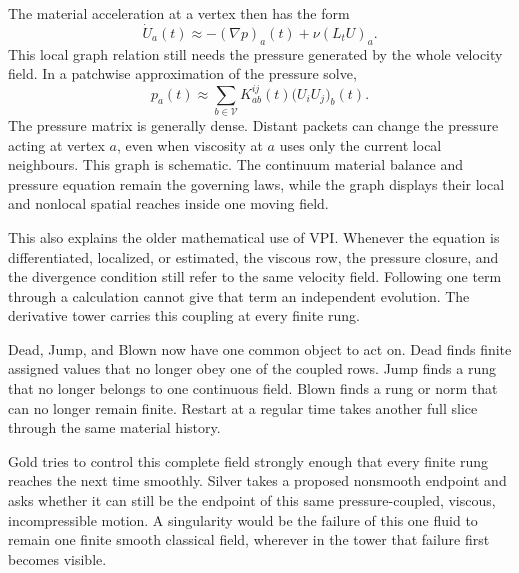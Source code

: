 The material acceleration at a vertex then has the form
\[
  \dot U_a(t)
  \approx
  -(\nabla p)_a(t)
  +
  \nu(L_tU)_a.
\]
This local graph relation still needs the pressure generated by the whole velocity field.
In a patchwise approximation of the pressure solve,
\[
  p_a(t)
  \approx
  \sum_{b\in\mathcal V}
  K_{ab}^{ij}(t)
  \bigl(U_iU_j\bigr)_b(t).
\]
The pressure matrix is generally dense.
Distant packets can change the pressure acting at vertex \(a\), even when viscosity at \(a\) uses only the current local neighbours.
This graph is schematic.
The continuum material balance and pressure equation remain the governing laws, while the graph displays their local and nonlocal spatial reaches inside one moving field.

This also explains the older mathematical use of VPI.
Whenever the equation is differentiated, localized, or estimated, the viscous row, the pressure closure, and the divergence condition still refer to the same velocity field.
Following one term through a calculation cannot give that term an independent evolution.
The derivative tower carries this coupling at every finite rung.

Dead, Jump, and Blown now have one common object to act on.
Dead finds finite assigned values that no longer obey one of the coupled rows.
Jump finds a rung that no longer belongs to one continuous field.
Blown finds a rung or norm that can no longer remain finite.
Restart at a regular time takes another full slice through the same material history.

Gold tries to control this complete field strongly enough that every finite rung reaches the next time smoothly.
Silver takes a proposed nonsmooth endpoint and asks whether it can still be the endpoint of this same pressure-coupled, viscous, incompressible motion.
A singularity would be the failure of this one fluid to remain one finite smooth classical field, wherever in the tower that failure first becomes visible.
